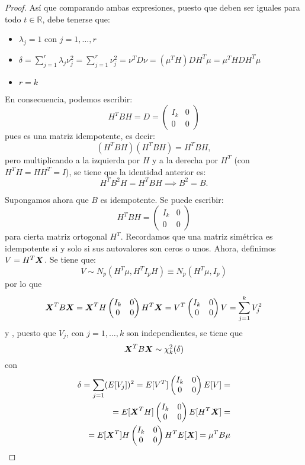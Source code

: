 \begin{proof}
Así que comparando ambas expresiones, puesto que deben ser iguales para todo $t \in \mathbb R$, debe tenerse que:
\begin{itemize}
\item $\lambda_j = 1$ con $ j = 1,\dots,r$
\item $\delta = \sum_{j = 1}^r \lambda_j \nu_j^2 = \sum_{j = 1}^r \nu_j^2 = \nu^T D \nu = (\mu^TH)DH^T\mu = \mu^THDH^T\mu$
  \item $r = k$
\end{itemize}
En consecuencia, podemos escribir:
\[
H^T B H = D = \begin{pmatrix} I_k & 0 \\ 0 & 0 \end{pmatrix}
\]
pues es una matriz idempotente, es decir:
\[
(H^T B H) (H^T B H) = H^T B H,
\]
pero multiplicando a la izquierda por $H$ y a la derecha por $H^T$ (con $H^TH = HH^T = I$), se tiene que la identidad anterior es:
\[
H^T B^2 H = H^T B H \implies B^2  = B.
\]

\boxed{\impliedby} Supongamos ahora que $B$ es idempotente. Se puede escribir:
\[
H^T B H = \begin{pmatrix} I_k & 0 \\ 0 & 0\end{pmatrix}
\]
para cierta matriz ortogonal $H^T$. Recordamos que una matriz simétrica es idempotente si y solo si sus autovalores son ceros o unos. Ahora, definimos  $V = H^T \boldsymbol{X}$. Se tiene que:
\[
V \sim N_p(H^T \mu, H^T I_p H) \equiv N_p(H^T \mu, I_p)
\]
por lo que
\[
\boldsymbol{X}^T B \boldsymbol{X} = \boldsymbol{X}^T H  \begin{pmatrix} I_k & 0 \\ 0 & 0\end{pmatrix} H^T \boldsymbol{X} = V^T  \begin{pmatrix} I_k & 0 \\ 0 & 0\end{pmatrix} V = \sum_{j = 1}^k V_j^2
\]
    y , puesto que $V_j$, con $j = 1,\dots,k$ son independientes, se tiene que
    \[
    \boldsymbol{X}^T B \boldsymbol{X} \sim \chi_k^2(\delta)
    \]
    con
    \begin{align}
      \delta = \sum_{j = 1} (E[V_j])^2 = E[V^T] \begin{pmatrix} I_k & 0 \\ 0 & 0\end{pmatrix} E[V] = \\
  = E[\boldsymbol{X}^T H]\begin{pmatrix} I_k & 0 \\ 0 & 0\end{pmatrix} E[H^T \boldsymbol{X}] = \\
          = E[\boldsymbol{X}^T] H \begin{pmatrix} I_k & 0 \\ 0 & 0\end{pmatrix} H^T E[\boldsymbol{X}] = \mu^T B \mu
     \end{align}
    

\end{proof}

